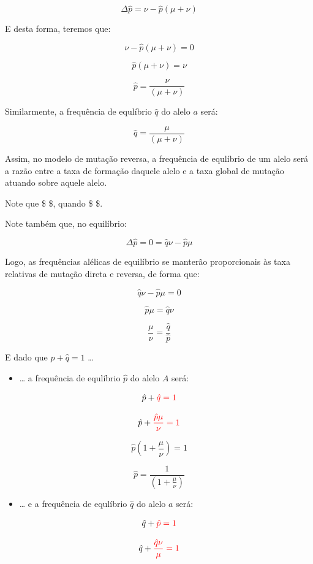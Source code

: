 \documentclass[
]{book}
\providecommand{\tightlist}{%
  \setlength{\itemsep}{0pt}\setlength{\parskip}{0pt}}
\begin{document}
\[ \Delta \hat{p} = \nu - \hat{p} (\mu + \nu) \]

E desta forma, teremos que:

\[ \nu - \hat{p} (\mu + \nu) = 0 \]

\[\hat{p} (\mu + \nu) =  \nu \]

\[\hat{p}  =  \frac{\nu}{(\mu + \nu)} \]

Similarmente, a frequência de equlíbrio \(\hat{q}\) do alelo \(a\) será:

\[\hat{q}  =  \frac{\mu}{(\mu + \nu)} \]

Assim, no modelo de mutação reversa, a frequência de equlíbrio de um alelo será a razão entre a taxa de formação daquele alelo e a taxa global de mutação atuando sobre aquele alelo.

Note que \$  \$, quando \$ \mu \gg \nu \$.

Note também que, no equilíbrio:

\[ \Delta \hat{p} = 0 = \hat{q} \nu - \hat{p} \mu\]

Logo, as frequências alélicas de equilíbrio se manterão proporcionais às taxa relativas de mutação direta e reversa, de forma que:

\[ \hat{q} \nu - \hat{p} \mu = 0 \]

\[\hat{p} \mu =  \hat{q} \nu \]

\[\frac{\mu}{\nu} = \frac{\hat{q}}{\hat{p}} \]

E dado que \(\hat{p} + \hat{q} = 1\) \ldots{}

\begin{itemize}
\tightlist
\item
  \ldots{} a frequência de equlíbrio \(\hat{p}\) do alelo \(A\) será:
\end{itemize}

\[\hat{p} + \color{red}{\hat{q}} = 1\]

\[\hat{p} + \color{red}{\frac{\hat{p}\mu}{\nu}} = 1\]

\[\hat{p} \left( 1 + \frac{\mu}{\nu} \right) = 1\]

\[\hat{p} = \frac{1}{\left( 1 + \frac{\mu}{\nu} \right)}\]

\begin{itemize}
\tightlist
\item
  \ldots{} e a frequência de equlíbrio \(\hat{q}\) do alelo \(a\) será:
\end{itemize}

\[\hat{q} + \color{red}{\hat{p}} = 1\]

\[\hat{q} + \color{red}{\frac{\hat{q}\nu}{\mu}} = 1\]
\end{document}

